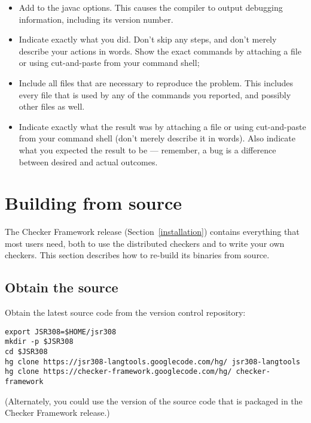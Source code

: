 \begin{itemize}
\item
  Add  to the javac options.  This causes the compiler to output
  debugging information, including its version number.
\item
  Indicate exactly what you did.  Don't skip any steps, and don't merely
  describe your actions in words.  Show the exact commands by attaching a
  file or using cut-and-paste from your command shell;
\item
  Include all files that are necessary to reproduce the problem.  This
  includes every file that is used by any of the commands you reported, and
  possibly other files as well.
\item
  Indicate exactly what the result was by attaching a file or using
  cut-and-paste from your command shell (don't merely describe it in
  words).  Also indicate what you expected the result to be --- remember, a
  bug is a difference between desired and actual outcomes.
\end{itemize}


\section{Building from source\label{build-source}}

The Checker Framework release (Section~\ref{installation}) contains everything that
most users need, both to use the distributed checkers and to write your own
checkers.  This section describes how to re-build its binaries from source.


\subsection{Obtain the source}

Obtain the latest source code from the version control repository:

\begin{Verbatim}
export JSR308=$HOME/jsr308
mkdir -p $JSR308
cd $JSR308
hg clone https://jsr308-langtools.googlecode.com/hg/ jsr308-langtools
hg clone https://checker-framework.googlecode.com/hg/ checker-framework
\end{Verbatim}

\noindent
(Alternately, you could use the version of the source code that is packaged
in the Checker Framework release.)


